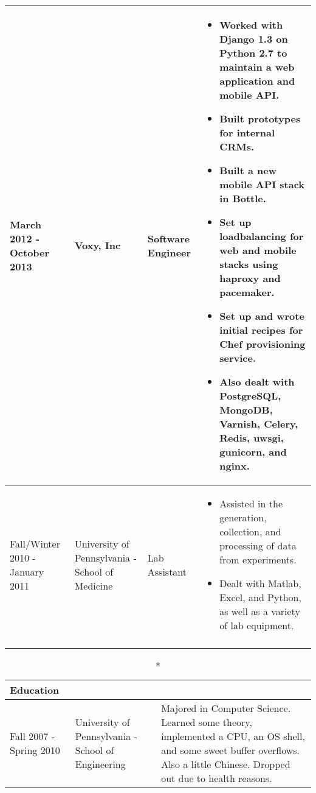 \documentclass[a4paper]{article}
\begin{document}
    \begin{longtable}{ m{3cm} m{3cm} m{3cm} m{8cm}}
        \hline
        March 2012 - \newline October 2013 & Voxy, Inc & Software Engineer & 
            \begin{itemize}
                \item Worked with Django 1.3 on Python 2.7 to maintain a web application and mobile API.
                \item Built prototypes for internal CRMs.
                \item Built a new mobile API stack in Bottle.
                \item Set up loadbalancing for web and mobile stacks using haproxy and pacemaker.
                \item Set up and wrote initial recipes for Chef provisioning service.
                \item Also dealt with PostgreSQL, MongoDB, Varnish, Celery, Redis, uwsgi, gunicorn, and nginx. 
            \end{itemize}
        \\
        \hline
        Fall/Winter 2010 - January 2011 & University of \newline Pennsylvania - \newline School of Medicine & Lab Assistant & 
            \begin{itemize}
                \item Assisted in the generation, collection, and processing of data from experiments. 
                \item Dealt with Matlab, Excel, and Python, as well as a variety of lab equipment.
            \end{itemize}
        \\
        \hline
        \par
    \end{longtable}

    \vspace{.2in}

    \begin{longtable}{ m{3cm} m{6.45cm} m{8cm} }
        \caption*{Education}\\
        \hline
        Fall 2007 - \newline Spring 2010 & University of \newline Pennsylvania - \newline School of Engineering & Majored in Computer Science. Learned some theory, implemented a CPU, an OS shell, and some sweet buffer overflows. Also a little Chinese. Dropped out due to health reasons. \\
    \end{longtable}
    
\end{document}

